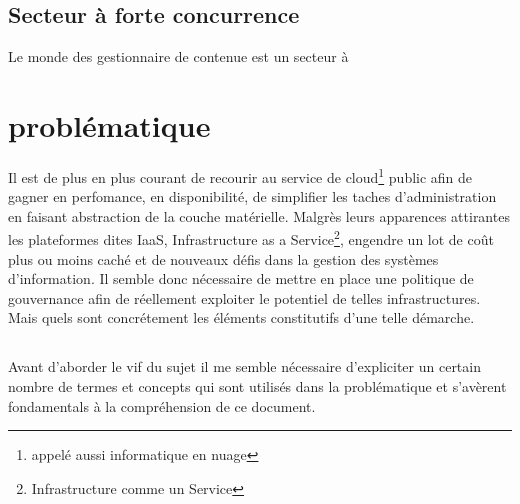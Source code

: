 \documentclass[11pt, a4paper ]{article}
\let\stdsection\section
\renewcommand\section{\newpage\stdsection}
\begin{document}
\begin{spacing}{1.5}
		\subsection{Secteur à forte concurrence}

Le monde des gestionnaire de contenue est un secteur à







		\section{problématique} %



Il est de plus en plus courant de recourir au service de cloud\footnote{appelé aussi informatique en nuage} public afin de gagner en perfomance, en disponibilité, de simplifier les taches d'administration en faisant abstraction de la couche matérielle.
Malgrès leurs apparences attirantes les plateformes dites IaaS, Infrastructure as a Service\footnote{Infrastructure comme un Service}, engendre un lot de coût plus ou moins caché et de nouveaux défis dans la gestion des systèmes d'information. Il semble donc nécessaire de mettre en place une politique de gouvernance afin de réellement exploiter le potentiel de telles infrastructures.
Mais quels sont concrétement les éléments constitutifs d'une telle démarche.

			\subsection*{}

Avant d'aborder le vif du sujet il me semble nécessaire d'expliciter un certain nombre de termes et concepts qui sont utilisés dans la problématique et s'avèrent fondamentals à la compréhension de ce document.


\end{spacing}
\end{document}
